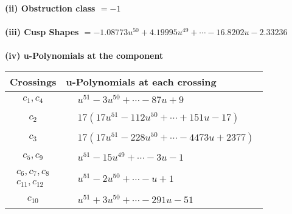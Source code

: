 \documentclass[1p]{elsarticle_modified}
\theoremstyle{definition}
\begin{document}
\flushleft \textbf{(ii) Obstruction class $= -1$}\\~\\
\flushleft \textbf{(iii) Cusp Shapes $= -1.08773 u^{50}+4.19995 u^{49}+\cdots-16.8202 u-2.33236$}\\~\\
\newpage\renewcommand{\arraystretch}{1}
\flushleft \textbf{(iv) u-Polynomials at the component}\newline \\
\begin{tabular}{m{50pt}|m{274pt}}
Crossings & \hspace{64pt}u-Polynomials at each crossing \\
\hline $$\begin{aligned}c_{1},c_{4}\end{aligned}$$&$\begin{aligned}
&u^{51}-3 u^{50}+\cdots-87 u+9
\end{aligned}$\\
\hline $$\begin{aligned}c_{2}\end{aligned}$$&$\begin{aligned}
&17(17 u^{51}-112 u^{50}+\cdots+151 u-17)
\end{aligned}$\\
\hline $$\begin{aligned}c_{3}\end{aligned}$$&$\begin{aligned}
&17(17 u^{51}-228 u^{50}+\cdots-4473 u+2377)
\end{aligned}$\\
\hline $$\begin{aligned}c_{5},c_{9}\end{aligned}$$&$\begin{aligned}
&u^{51}-15 u^{49}+\cdots-3 u-1
\end{aligned}$\\
\hline $$\begin{aligned}c_{6},c_{7},c_{8}\\c_{11},c_{12}\end{aligned}$$&$\begin{aligned}
&u^{51}-2 u^{50}+\cdots- u+1
\end{aligned}$\\
\hline $$\begin{aligned}c_{10}\end{aligned}$$&$\begin{aligned}
&u^{51}+3 u^{50}+\cdots-291 u-51
\end{aligned}$\\
\hline
\end{tabular}\\~\\
\end{document}
